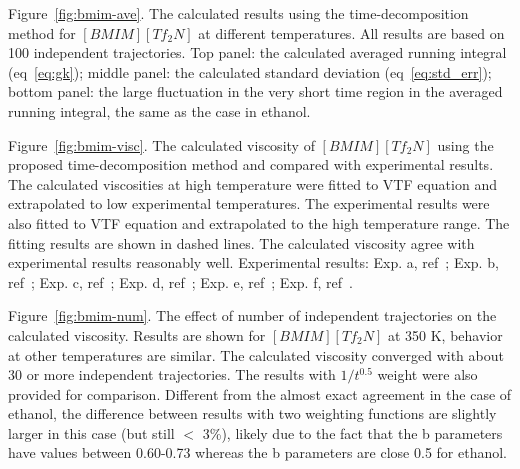 \documentclass[12pt]{article}
\begin{document}
Figure~\ref{fig:bmim-ave}.
The calculated results using the time-decomposition method for $[BMIM][Tf_2N]$ at different temperatures.
All results are based on 100 independent trajectories.
Top panel: the calculated averaged running integral (eq~\ref{eq:gk});
middle panel: the calculated standard deviation (eq~\ref{eq:std_err});
bottom panel: the large fluctuation in the very short time region in the averaged running integral,
the same as the case in ethanol.

Figure~\ref{fig:bmim-visc}.
The calculated viscosity of $[BMIM][Tf_2N]$ using the proposed time-decomposition method
and compared with experimental results.
The calculated viscosities at high temperature were fitted to VTF equation
and extrapolated to low experimental temperatures.
The experimental results were also fitted to VTF equation
and extrapolated to the high temperature range.
The fitting results are shown in dashed lines.
The calculated viscosity agree with experimental results reasonably well.
Experimental results: 
Exp. a, ref~\cite{Gadzuric.JCED.57.1072.2012};
Exp. b, ref~\cite{Katsuta.JCED.55.1588.2010};
Exp. c, ref~\cite{Watanabe.JPCB.110.19593.2006};
Exp. d, ref~\cite{Majer.GC.8.172.2006};
Exp. e, ref~\cite{Watanabe.JPCB.109.6103.2005};
Exp. f, ref~\cite{VanderNoot.JEC.568.167.2004}.

Figure~\ref{fig:bmim-num}.
The effect of number of independent trajectories on the calculated viscosity.
Results are shown for $[BMIM][Tf_2N]$ at 350 K, behavior at other temperatures are similar.
The calculated viscosity converged with about 30 or more independent trajectories.
The results with $1/t^{0.5}$ weight were also provided for comparison.
Different from the almost exact agreement in the case of ethanol,
the difference between results with two weighting functions are slightly larger in this case
(but still $<$ 3\%),
likely due to the fact that the b parameters have values between 0.60-0.73
whereas the b parameters are close 0.5 for ethanol.




\newpage
\clearpage
\begin{figure}
\begin{center}
\caption{}
\label{fig:visc-longtraj}
\end{center}
\end{figure}

\newpage
\clearpage
\begin{figure}
\begin{center}
\caption{}
\label{fig:density}
\end{center}
\end{figure}
\end{document}
